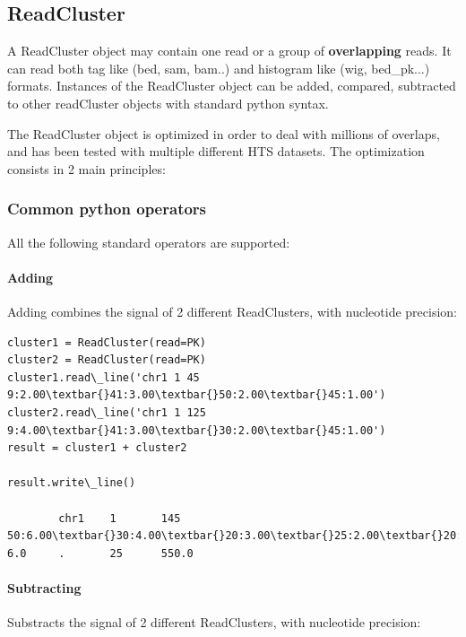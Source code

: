 \documentclass[letterpaper,10pt,english]{sphinxmanual}
\begin{document}
\subsection{ReadCluster}
\label{pyicoteolib:readcluster}
A ReadCluster object may contain one read or a group of \textbf{overlapping} reads. It can read both tag like (bed, sam, bam..) and histogram like (wig, bed\_pk...) formats. Instances of the ReadCluster object can be added, compared, subtracted to other readCluster objects with standard python syntax.

The ReadCluster object is optimized in order to deal with millions of overlaps, and has been tested with multiple different HTS datasets. The optimization consists in 2 main principles:


\subsubsection{Common python operators}
\label{pyicoteolib:common-python-operators}
All the following standard operators are supported:


\paragraph{Adding}
\label{pyicoteolib:adding}
Adding combines the signal of 2 different ReadClusters, with nucleotide precision:

\begin{Verbatim}[commandchars=\\\{\}]
cluster1 = ReadCluster(read=PK)
cluster2 = ReadCluster(read=PK)
cluster1.read\_line('chr1 1 45 9:2.00\textbar{}41:3.00\textbar{}50:2.00\textbar{}45:1.00')
cluster2.read\_line('chr1 1 125 9:4.00\textbar{}41:3.00\textbar{}30:2.00\textbar{}45:1.00')
result = cluster1 + cluster2

result.write\_line()

        chr1    1       145     50:6.00\textbar{}30:4.00\textbar{}20:3.00\textbar{}25:2.00\textbar{}20:1.00 6.0     .       25      550.0
\end{Verbatim}


\paragraph{Subtracting}
\label{pyicoteolib:subtracting}
Substracts the signal of 2 different ReadClusters, with nucleotide precision:
\end{document}
